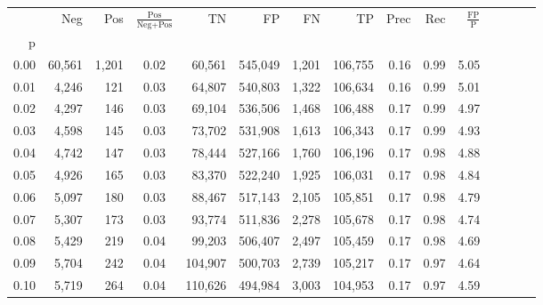 \begin{tabular}{rrrcrrrrrrrrrrr}
\toprule
{} &     Neg &     Pos & $\frac{\text{Pos}}{\text{Neg}+\text{Pos}}$ &       TN &       FP &       FN &       TP &  Prec &   Rec & $\frac{\text{FP}}{\text{P}}$ \\
p    &         &         &                                            &          &          &          &          &       &       &                              \\
\midrule
0.00 &  60,561 &   1,201 &                                       0.02 &   60,561 &  545,049 &    1,201 &  106,755 &  0.16 &  0.99 &                         5.05 \\
0.01 &   4,246 &     121 &                                       0.03 &   64,807 &  540,803 &    1,322 &  106,634 &  0.16 &  0.99 &                         5.01 \\
0.02 &   4,297 &     146 &                                       0.03 &   69,104 &  536,506 &    1,468 &  106,488 &  0.17 &  0.99 &                         4.97 \\
0.03 &   4,598 &     145 &                                       0.03 &   73,702 &  531,908 &    1,613 &  106,343 &  0.17 &  0.99 &                         4.93 \\
0.04 &   4,742 &     147 &                                       0.03 &   78,444 &  527,166 &    1,760 &  106,196 &  0.17 &  0.98 &                         4.88 \\
0.05 &   4,926 &     165 &                                       0.03 &   83,370 &  522,240 &    1,925 &  106,031 &  0.17 &  0.98 &                         4.84 \\
0.06 &   5,097 &     180 &                                       0.03 &   88,467 &  517,143 &    2,105 &  105,851 &  0.17 &  0.98 &                         4.79 \\
0.07 &   5,307 &     173 &                                       0.03 &   93,774 &  511,836 &    2,278 &  105,678 &  0.17 &  0.98 &                         4.74 \\
0.08 &   5,429 &     219 &                                       0.04 &   99,203 &  506,407 &    2,497 &  105,459 &  0.17 &  0.98 &                         4.69 \\
0.09 &   5,704 &     242 &                                       0.04 &  104,907 &  500,703 &    2,739 &  105,217 &  0.17 &  0.97 &                         4.64 \\
0.10 &   5,719 &     264 &                                       0.04 &  110,626 &  494,984 &    3,003 &  104,953 &  0.17 &  0.97 &                         4.59 \\

\end{tabular}
